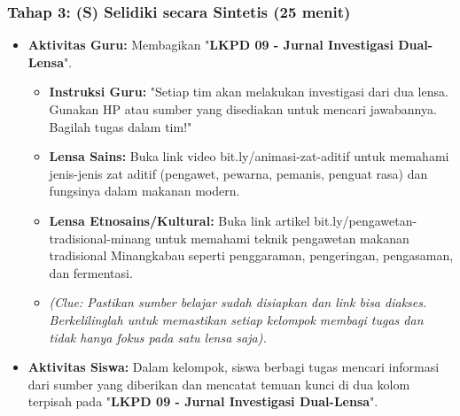 \documentclass[a4paper,12pt]{article}
\begin{document}
\subsubsection{Tahap 3: (S) Selidiki secara Sintetis (25 menit)}
\begin{itemize}
\item \textbf{Aktivitas Guru:} Membagikan "\textbf{LKPD 09 - Jurnal Investigasi Dual-Lensa}".
    \begin{itemize}
    \item \textbf{Instruksi Guru:} "Setiap tim akan melakukan investigasi dari dua lensa. Gunakan HP atau sumber yang disediakan untuk mencari jawabannya. Bagilah tugas dalam tim!"
    \item \textbf{Lensa Sains:} Buka link video bit.ly/animasi-zat-aditif untuk memahami jenis-jenis zat aditif (pengawet, pewarna, pemanis, penguat rasa) dan fungsinya dalam makanan modern.
    \item \textbf{Lensa Etnosains/Kultural:} Buka link artikel bit.ly/pengawetan-tradisional-minang untuk memahami teknik pengawetan makanan tradisional Minangkabau seperti penggaraman, pengeringan, pengasaman, dan fermentasi.
    \item \textit{(Clue: Pastikan sumber belajar sudah disiapkan dan link bisa diakses. Berkelilinglah untuk memastikan setiap kelompok membagi tugas dan tidak hanya fokus pada satu lensa saja).}
    \end{itemize}
\item \textbf{Aktivitas Siswa:} Dalam kelompok, siswa berbagi tugas mencari informasi dari sumber yang diberikan dan mencatat temuan kunci di dua kolom terpisah pada "\textbf{LKPD 09 - Jurnal Investigasi Dual-Lensa}".
\end{itemize}
\end{document}
